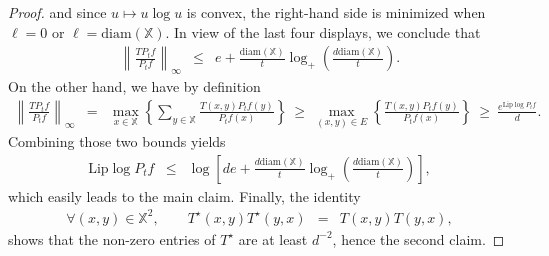 \documentclass[10pt,a4paper]{amsart}
\newcommand{\Lip}{\mathrm {Lip}}
\newcommand{\dX}{\mathbb{X}}
\newcommand{\diam}{\mathrm{diam}}
\begin{document}
\begin{proof}
and since $u\mapsto u\log u$ is convex, the right-hand side is minimized when $\ell=0$ or $\ell=\diam(\dX)$. In view of the last four displays, we conclude that
\begin{eqnarray*}
\left\|\frac{TP_t f}{P_tf} \right\|_\infty & \le & e+\frac{\diam(\dX)}{t}\log_+\left(\frac{d\diam(\dX)}{t}\right).
 \end{eqnarray*}
On the other hand,  we  have by definition
\begin{eqnarray*}
\left\|\frac{TP_t f}{P_tf} \right\|_\infty & = & \max_{x\in\dX}\left\{\sum_{y\in\dX}\frac{T(x,y)P_tf(y)}{P_tf(x)}\right\} \ \ge \  \max_{(x,y)\in E}\left\{\frac{T(x,y)P_tf(y)}{P_tf(x)}\right\} \ \ge \ \frac{e^{\Lip\log P_tf}}{d}.
\end{eqnarray*}
Combining those two bounds yields 
\begin{eqnarray*}
\Lip\log P_tf & \le & \log\left[de+\frac{d\diam(\dX)}{t}\log_+\left(\frac{d\diam(\dX)}{t}\right)\right],
\end{eqnarray*}
which easily leads to the main claim. Finally,  the identity 
\begin{eqnarray*}
\forall (x,y)\in\dX^2,\qquad T^\star(x,y)T^\star(y,x) & = & T(x,y)T(y,x),
\end{eqnarray*}
shows that the non-zero entries of $T^\star$ are at least $d^{-2}$, hence the second claim. 
\end{proof}
\end{document}
